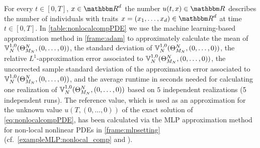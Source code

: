 For every $t\in[0,T]$, $x\in\R^d$ the number $u(t,x) \in \R$ describes the number of individuals with traits $x = (x_1, \dots, x_d) \in \R^d$ at time $t \in [0,T]$.
In \cref{table:nonlocalcompPDE}
we use the machine learning-based approximation method
in \cref{frame:adam}
to approximately calculate
the mean of %
$
{\mathbb{V}}^{1,0}_N(\Theta^N_{M_N},(0,\ldots,0))
$,
the standard deviation of %
$
{\mathbb{V}}^{1,0}_N(\Theta^N_{M_N},(0,\ldots,0))
$,
the relative $ L^1 $-approximation error associated to %
$
{\mathbb{V}}^{1,0}_N(\Theta^N_{M_N},(0,\ldots,0))
$,
the uncorrected sample standard deviation of the approximation error associated to %
$
{\mathbb{V}}^{1,0}_N(\Theta^N_{M_N},(0,\ldots,0))
$,
and the average runtime in seconds needed for calculating one realization of $
{\mathbb{V}}^{1,0}_N(\Theta^N_{M_N},(0,\ldots,0))
$
%
based on $5$ independent realizations (5 independent runs).
%
The reference value, which is used as an approximation for the unknown value $u(T,(0,\ldots,0))$ of the exact solution of \eqref{eq:nonlocalcompPDE},  has been calculated via the MLP approximation method for non-local nonlinear PDEs in \cref{frame:mlpsetting} (cf.~\cref{exampleMLP:nonlocal_comp} and \cite[Remark~3.3]{Beck2017a}).


